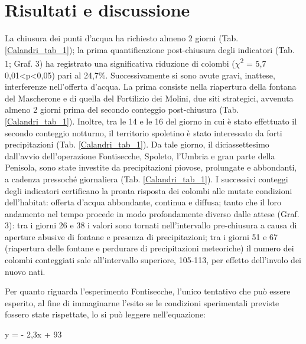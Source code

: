 \section*{Risultati e discussione}

La chiusura dei punti d{\textquoteright}acqua ha richiesto almeno 2
giorni (Tab. \ref{Calandri_tab_1}); la prima quantificazione post-chiusura degli
indicatori (Tab. 1; Graf. 3) ha registrato una significativa riduzione
di colombi (${\chi}$\textsuperscript{2} = 5,7 
0,01{\textless}p{\textless}0,05) pari al 24,7\%. Successivamente si
sono avute gravi, inattese, interferenze nell{\textquoteright}offerta
d{\textquoteright}acqua. La prima consiste nella riapertura della
fontana del Mascherone e di quella del Fortilizio dei Molini, due siti
strategici, avvenuta almeno 2 giorni prima del secondo conteggio
post-chiusura  (Tab. \ref{Calandri_tab_1}). Inoltre, tra le 14 e le 16 del giorno in cui
\`e stato effettuato il secondo conteggio notturno, il territorio
spoletino \`e stato interessato da forti precipitazioni (Tab. \ref{Calandri_tab_1}). Da
tale giorno, il diciassettesimo dall{\textquoteright}avvio
dell{\textquoteright}operazione Fontisecche, Spoleto,
l{\textquoteright}Umbria e gran parte della Penisola, sono state
investite da precipitazioni piovose, prolungate e abbondanti, a cadenza
pressoch\'e giornaliera (Tab. \ref{Calandri_tab_1}). I successivi conteggi degli
indicatori certificano la pronta risposta dei colombi alle mutate
condizioni dell{\textquoteright}habitat: offerta
d{\textquoteright}acqua abbondante, continua e diffusa; tanto che il
loro andamento nel tempo procede in modo profondamente diverso dalle
attese (Graf. 3): tra i giorni 26 e 38 i valori sono tornati
nell{\textquoteright}intervallo pre-chiusura a causa di aperture
abusive di fontane e presenza di precipitazioni; tra i giorni 51 e 67
(riapertura delle fontane e perdurare di precipitazioni meteoriche)
\textcolor{black}{il numero dei colombi conteggiati} sale
all{\textquoteright}intervallo superiore, 105-113, per effetto
dell{\textquoteright}involo dei nuovo nati. 

Per quanto riguarda l{\textquoteright}esperimento Fontisecche,
l{\textquoteright}unico tentativo che pu\`o essere esperito, al fine di
immaginarne l{\textquoteright}esito se le condizioni sperimentali
previste fossero state rispettate, lo si pu\`o leggere
nell{\textquoteright}equazione: 

\begin{center}
 y = - 2,3x + 93 
\end{center}

